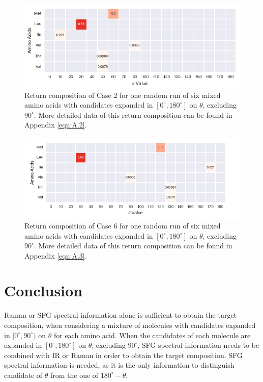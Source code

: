 \begin{figure}[!ht] 
\centering
\includegraphics[scale=0.7]{Figures/mixture_return_composition_of_E2_for_one_run_theta_0_180.png}
\caption{Return composition of Case 2 for one random run of six mixed amino acids with candidates expanded in $[0^{\circ}, 180^{\circ}]$ on $\theta$, excluding $90^{\circ}$. More detailed data of this return composition can be found in Appendix \ref{eqn:A.2}.} 
\label{fig:5.5}
\end{figure}

\begin{figure}[!ht] 
\centering
\includegraphics[scale=0.7]{Figures/mixture_return_composition_of_E6_for_one_run_theta_0_180.png}
\caption{Return composition of Case 6 for one random run of six mixed amino acids with candidates expanded in $[0^{\circ}, 180^{\circ}]$ on $\theta$, excluding $90^{\circ}$. More detailed data of this return composition can be found in Appendix \ref{eqn:A.3}.} 
\label{fig:5.6}
\end{figure}

\section{Conclusion}
Raman or SFG spectral information alone is sufficient to obtain the target composition, when considering a mixture of molecules with candidates expanded in $[0^{\circ}, 90^{\circ})$ on $\theta$ for each amino acid. When the candidates of each molecule are expanded in $[0^{\circ}, 180^{\circ}]$ on $\theta$, excluding $90^{\circ}$, SFG spectral information needs to be combined with IR or Raman in order to obtain the target composition. SFG spectral information is needed, as it is the only information to distinguish candidate of $\theta$ from the one of $180^{\circ}-\theta$.\\

